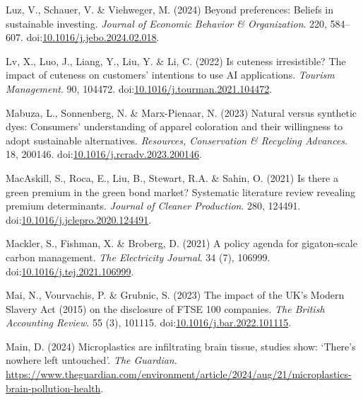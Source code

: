 \documentclass[
  letterpaper,
  DIV=11,
  numbers=noendperiod]{scrartcl}
\newlength{\cslhangindent}
\newenvironment{CSLReferences}[2] %
 {\begin{list}{}{%
  \setlength{\itemindent}{0pt}
  \setlength{\leftmargin}{0pt}
  \setlength{\parsep}{0pt}
  \ifodd #1
   \setlength{\leftmargin}{\cslhangindent}
   \setlength{\itemindent}{-1\cslhangindent}
  \fi
  \setlength{\itemsep}{#2\baselineskip}}}
 {\end{list}}
\begin{document}
\begin{CSLReferences}{0}{1}
Luz, V., Schauer, V. \& Viehweger, M. (2024) Beyond preferences:
{Beliefs} in sustainable investing. \emph{Journal of Economic Behavior
\& Organization}. 220, 584--607.
doi:\href{https://doi.org/10.1016/j.jebo.2024.02.018}{10.1016/j.jebo.2024.02.018}.

Lv, X., Luo, J., Liang, Y., Liu, Y. \& Li, C. (2022) Is cuteness
irresistible? {The} impact of cuteness on customers' intentions to use
{AI} applications. \emph{Tourism Management}. 90, 104472.
doi:\href{https://doi.org/10.1016/j.tourman.2021.104472}{10.1016/j.tourman.2021.104472}.

Mabuza, L., Sonnenberg, N. \& Marx-Pienaar, N. (2023) Natural versus
synthetic dyes: {Consumers}' understanding of apparel coloration and
their willingness to adopt sustainable alternatives. \emph{Resources,
Conservation \& Recycling Advances}. 18, 200146.
doi:\href{https://doi.org/10.1016/j.rcradv.2023.200146}{10.1016/j.rcradv.2023.200146}.

MacAskill, S., Roca, E., Liu, B., Stewart, R.A. \& Sahin, O. (2021) Is
there a green premium in the green bond market? {Systematic} literature
review revealing premium determinants. \emph{Journal of Cleaner
Production}. 280, 124491.
doi:\href{https://doi.org/10.1016/j.jclepro.2020.124491}{10.1016/j.jclepro.2020.124491}.

Mackler, S., Fishman, X. \& Broberg, D. (2021) A policy agenda for
gigaton-scale carbon management. \emph{The Electricity Journal}. 34 (7),
106999.
doi:\href{https://doi.org/10.1016/j.tej.2021.106999}{10.1016/j.tej.2021.106999}.

Mai, N., Vourvachis, P. \& Grubnic, S. (2023) The impact of the {UK}'s
{Modern Slavery Act} (2015) on the disclosure of {FTSE} 100 companies.
\emph{The British Accounting Review}. 55 (3), 101115.
doi:\href{https://doi.org/10.1016/j.bar.2022.101115}{10.1016/j.bar.2022.101115}.

Main, D. (2024) Microplastics are infiltrating brain tissue, studies
show: {`{There}'s nowhere left untouched'}. \emph{The Guardian}.
\url{https://www.theguardian.com/environment/article/2024/aug/21/microplastics-brain-pollution-health}.


\end{CSLReferences}
\end{document}
